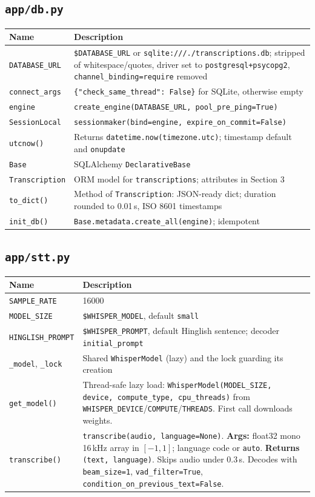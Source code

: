 \documentclass[11pt,a4paper]{article}
\begin{document}
\subsection{\texttt{app/db.py}}
\begin{longtable}{@{}p{4.6cm}p{10.6cm}@{}}
\toprule
\textbf{Name} & \textbf{Description}\\
\midrule
\endhead
\texttt{DATABASE\_URL} & \texttt{\$DATABASE\_URL} or \texttt{sqlite:///./transcriptions.db}; stripped of whitespace/quotes, driver set to \texttt{postgresql+psycopg2}, \texttt{channel\_binding=require} removed\\
\texttt{connect\_args} & \texttt{\{"check\_same\_thread": False\}} for SQLite, otherwise empty\\
\texttt{engine} & \texttt{create\_engine(DATABASE\_URL, pool\_pre\_ping=True)}\\
\texttt{SessionLocal} & \texttt{sessionmaker(bind=engine, expire\_on\_commit=False)}\\
\texttt{utcnow()} & Returns \texttt{datetime.now(timezone.utc)}; timestamp default and \texttt{onupdate}\\
\texttt{Base} & SQLAlchemy \texttt{DeclarativeBase}\\
\texttt{Transcription} & ORM model for \texttt{transcriptions}; attributes in Section 3\\
\texttt{to\_dict()} & Method of \texttt{Transcription}: JSON-ready dict; duration rounded to 0.01\,s, ISO 8601 timestamps\\
\texttt{init\_db()} & \texttt{Base.metadata.create\_all(engine)}; idempotent\\
\bottomrule
\end{longtable}

\subsection{\texttt{app/stt.py}}
\begin{longtable}{@{}p{4.6cm}p{10.6cm}@{}}
\toprule
\textbf{Name} & \textbf{Description}\\
\midrule
\endhead
\texttt{SAMPLE\_RATE} & 16000\\
\texttt{MODEL\_SIZE} & \texttt{\$WHISPER\_MODEL}, default \texttt{small}\\
\texttt{HINGLISH\_PROMPT} & \texttt{\$WHISPER\_PROMPT}, default Hinglish sentence; decoder \texttt{initial\_prompt}\\
\texttt{\_model}, \texttt{\_lock} & Shared \texttt{WhisperModel} (lazy) and the lock guarding its creation\\
\texttt{get\_model()} & Thread-safe lazy load: \texttt{WhisperModel(MODEL\_SIZE, device, compute\_type, cpu\_threads)} from \texttt{WHISPER\_DEVICE}/\texttt{COMPUTE}/\texttt{THREADS}. First call downloads weights.\\
\texttt{transcribe()} & \texttt{transcribe(audio, language=None)}. \textbf{Args:} float32 mono 16\,kHz array in $[-1,1]$; language code or \texttt{auto}. \textbf{Returns} \texttt{(text, language)}. Skips audio under 0.3\,s. Decodes with \texttt{beam\_size=1}, \texttt{vad\_filter=True}, \texttt{condition\_on\_previous\_text=False}.\\
\bottomrule
\end{longtable}
\end{document}
